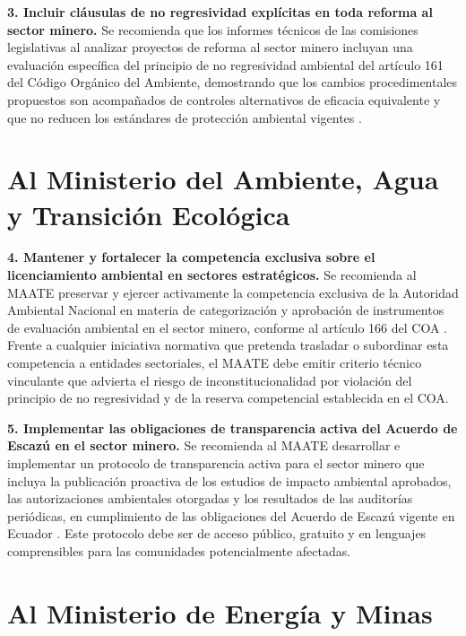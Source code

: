 \textbf{3. Incluir cláusulas de no regresividad explícitas en toda reforma al sector minero.} Se recomienda que los informes técnicos de las comisiones legislativas al analizar proyectos de reforma al sector minero incluyan una evaluación específica del principio de no regresividad ambiental del artículo 161 del Código Orgánico del Ambiente, demostrando que los cambios procedimentales propuestos son acompañados de controles alternativos de eficacia equivalente y que no reducen los estándares de protección ambiental vigentes \parencite{coa_2017}.

\section*{Al Ministerio del Ambiente, Agua y Transición Ecológica}

\textbf{4. Mantener y fortalecer la competencia exclusiva sobre el licenciamiento ambiental en sectores estratégicos.} Se recomienda al MAATE preservar y ejercer activamente la competencia exclusiva de la Autoridad Ambiental Nacional en materia de categorización y aprobación de instrumentos de evaluación ambiental en el sector minero, conforme al artículo 166 del COA \parencite{coa_2017}. Frente a cualquier iniciativa normativa que pretenda trasladar o subordinar esta competencia a entidades sectoriales, el MAATE debe emitir criterio técnico vinculante que advierta el riesgo de inconstitucionalidad por violación del principio de no regresividad y de la reserva competencial establecida en el COA.

\textbf{5. Implementar las obligaciones de transparencia activa del Acuerdo de Escazú en el sector minero.} Se recomienda al MAATE desarrollar e implementar un protocolo de transparencia activa para el sector minero que incluya la publicación proactiva de los estudios de impacto ambiental aprobados, las autorizaciones ambientales otorgadas y los resultados de las auditorías periódicas, en cumplimiento de las obligaciones del Acuerdo de Escazú vigente en Ecuador \parencite{acuerdo_escazu_2018}. Este protocolo debe ser de acceso público, gratuito y en lenguajes comprensibles para las comunidades potencialmente afectadas.

\section*{Al Ministerio de Energía y Minas}

